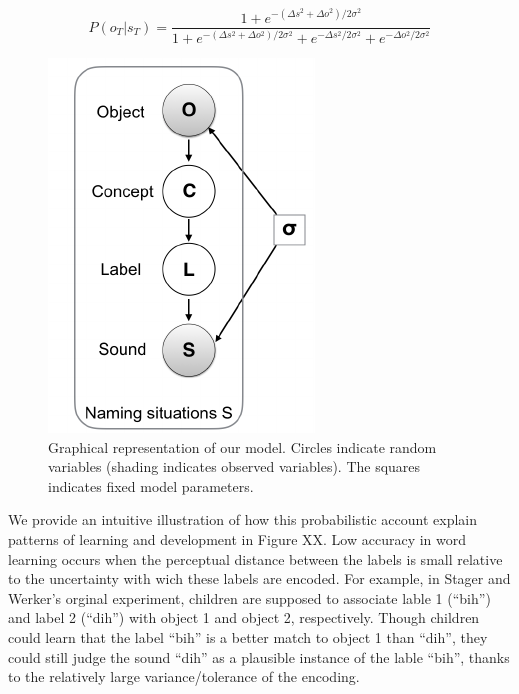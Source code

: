 \documentclass[10pt, letterpaper]{article}
\newenvironment{CodeChunk}{}{}
\begin{document}
\begin{equation}
P(o_T|s_T)= \frac{1 + e^{-(\Delta s^2 + \Delta o^2) /2\sigma^2}}{1 + e^{-(\Delta s^2 + \Delta o^2) /2\sigma^2} + e^{-\Delta s^2 /2\sigma^2} + e^{-\Delta o^2 /2\sigma^2 }}
\end{equation}

\begin{CodeChunk}
\begin{figure}[h]

{\centering \includegraphics{figs/model-1} 

}

\caption{\label{fig:model}Graphical representation of our model. Circles indicate random variables (shading indicates observed variables). The squares indicates fixed model parameters.}\label{fig:model}
\end{figure}
\end{CodeChunk}

We provide an intuitive illustration of how this probabilistic account
explain patterns of learning and development in Figure XX. Low accuracy
in word learning occurs when the perceptual distance between the labels
is small relative to the uncertainty with wich these labels are encoded.
For example, in Stager and Werker's orginal experiment, children are
supposed to associate lable 1 (``bih'') and label 2 (``dih'') with
object 1 and object 2, respectively. Though children could learn that
the label ``bih'' is a better match to object 1 than ``dih'', they could
still judge the sound ``dih'' as a plausible instance of the lable
``bih'', thanks to the relatively large variance/tolerance of the
encoding.
\end{document}
